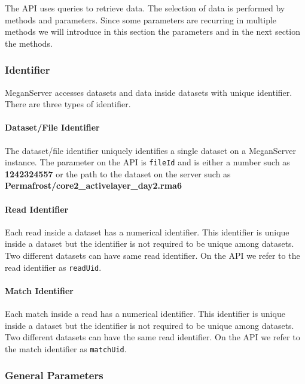 \documentclass[11pt]{article}
\begin{document}
The API uses queries to retrieve data. The selection of data is performed by methods and parameters. Since some parameters are recurring in multiple methods we will introduce in this section the parameters and in the next section the methods.


\subsubsection{Identifier}

MeganServer accesses datasets and data inside datasets with unique identifier. There are three types of identifier.

\paragraph{Dataset/File Identifier}
\label{subsec:fileid}

The dataset/file identifier uniquely identifies a single dataset on a MeganServer instance. The parameter on the API is \texttt{fileId} and is either a number such as \textbf{1242324557} or the path to the dataset on the server such as \textbf{Permafrost/core2\_activelayer\_day2.rma6}

\paragraph{Read Identifier}
\label{subsec:readuid}

Each read inside a dataset has a numerical identifier. This identifier is unique inside a dataset but the identifier is not required to be unique among datasets. Two different datasets can have same read identifier. On the API we refer to the read identifier as \texttt{readUid}.

\paragraph{Match Identifier}
\label{subsec:matchuid}

Each match inside a read has a numerical identifier. This identifier is unique inside a dataset but the identifier is not required to be unique among datasets. Two different datasets can have the same read identifier. On the API we refer to the match identifier as \texttt{matchUid}.


\subsubsection{General Parameters}
\end{document}

